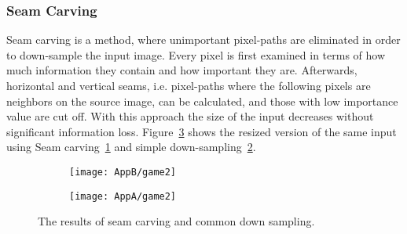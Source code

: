 \documentclass[draft,final]{vutinfth} %
\begin{document}
	\subsubsection{Seam Carving}
	\label{seamCarving}
	Seam carving is a method, where unimportant pixel-paths are eliminated in order to down-sample the input image.
	Every pixel is first examined in terms of how much information they contain and how important they are.
	Afterwards, horizontal and vertical seams, i.e. pixel-paths where the following pixels are neighbors on the source image, can be calculated, and those with low importance value are cut off.
	With this approach the size of the input decreases without significant information loss.  
	Figure~\ref{fig:diff} shows the resized version of the same input using Seam carving~\ref{fig:seamCarv} and simple down-sampling~\ref{fig:downSampl}.\par 
	\begin{figure}[H]
		\centering
		\begin{subfigure}[b]{0.45\columnwidth}
			\centering
			\texttt{[image: AppB/game2]}
			\label{fig:seamCarv}
		\end{subfigure}
		\begin{subfigure}[b]{0.45\columnwidth}
			\centering
			\texttt{[image: AppA/game2]}
			\label{fig:downSampl}
		\end{subfigure}
		\caption{The results of seam carving and common down sampling.}
		\label{fig:diff} %
	\end{figure}
\end{document}
